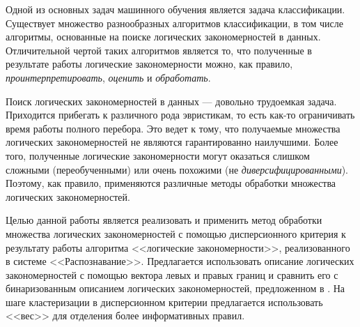 \documentclass[12pt]{article}
\begin{document}




Одной из основных задач машинного обучения является задача
классификации. Существует множество разнообразных алгоритмов
классификации, в том числе алгоритмы, основанные на поиске логических
закономерностей в данных. Отличительной чертой таких алгоритмов
является то, что полученные в результате работы логические
закономерности можно, как правило, \emph{проинтерпретировать},
\emph{оценить} и \emph{обработать}.

Поиск логических закономерностей в данных --- довольно
трудоемкая задача. Приходится прибегать к различного рода эвристикам,
то есть как-то ограничивать время работы полного перебора. Это ведет к
тому, что получаемые множества логических закономерностей не являются
гарантированно наилучшими. Более того, полученные логические
закономерности могут оказаться слишком сложными (переобученными) или
очень похожими (не \emph{диверсифицированными}). Поэтому, как правило,
применяются различные методы обработки множества логических
закономерностей.

Целью данной работы является реализовать и применить метод обработки
множества логических закономерностей с помощью дисперсионного критерия
к результату работы алгоритма <<логические закономерности>>,
реализованного в системе <<Распознавание>>. Предлагается использовать
описание логических закономерностей с помощью вектора левых и правых
границ и сравнить его с бинаризованным описанием логических
закономерностей, предложенном в \cite{novikov15}. На шаге
кластеризации в дисперсионном критерии предлагается использовать
<<вес>> для отделения более информативных правил.
\end{document}
